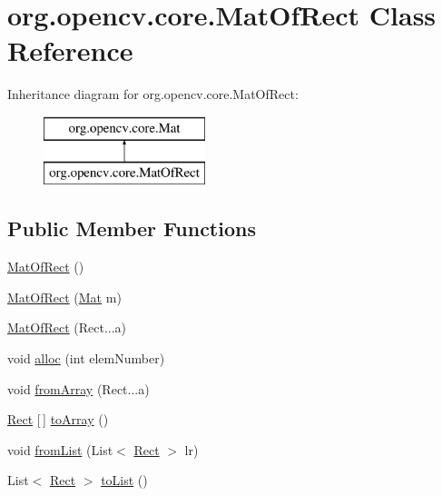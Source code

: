 \hypertarget{classorg_1_1opencv_1_1core_1_1_mat_of_rect}{}\section{org.\+opencv.\+core.\+Mat\+Of\+Rect Class Reference}
\label{classorg_1_1opencv_1_1core_1_1_mat_of_rect}
Inheritance diagram for org.\+opencv.\+core.\+Mat\+Of\+Rect\+:\begin{figure}[H]
\begin{center}
\leavevmode
\includegraphics[height=2.000000cm]{classorg_1_1opencv_1_1core_1_1_mat_of_rect}
\end{center}
\end{figure}
\subsection*{Public Member Functions}
\begin{DoxyCompactItemize}
\item 
\mbox{\hyperlink{classorg_1_1opencv_1_1core_1_1_mat_of_rect_aed75ce193773aa5db797a83e6a714a97}{Mat\+Of\+Rect}} ()
\item 
\mbox{\hyperlink{classorg_1_1opencv_1_1core_1_1_mat_of_rect_ab8740742fa18b3d836dd56f795f1dac5}{Mat\+Of\+Rect}} (\mbox{\hyperlink{classorg_1_1opencv_1_1core_1_1_mat}{Mat}} m)
\item 
\mbox{\hyperlink{classorg_1_1opencv_1_1core_1_1_mat_of_rect_a2b662761b046608ad3f1eced2b9f92ae}{Mat\+Of\+Rect}} (Rect...\+a)
\item 
void \mbox{\hyperlink{classorg_1_1opencv_1_1core_1_1_mat_of_rect_a761c8df15b71d5d9854b8616f8fdbca7}{alloc}} (int elem\+Number)
\item 
void \mbox{\hyperlink{classorg_1_1opencv_1_1core_1_1_mat_of_rect_afaa0f214e9d4e3659c605159dee4d133}{from\+Array}} (Rect...\+a)
\item 
\mbox{\hyperlink{classorg_1_1opencv_1_1core_1_1_rect}{Rect}} \mbox{[}$\,$\mbox{]} \mbox{\hyperlink{classorg_1_1opencv_1_1core_1_1_mat_of_rect_a17de540688a22e74500c4da2c0053176}{to\+Array}} ()
\item 
void \mbox{\hyperlink{classorg_1_1opencv_1_1core_1_1_mat_of_rect_a3ac6ecf845a01e79302cf8f01a9c9ff9}{from\+List}} (List$<$ \mbox{\hyperlink{classorg_1_1opencv_1_1core_1_1_rect}{Rect}} $>$ lr)
\item 
List$<$ \mbox{\hyperlink{classorg_1_1opencv_1_1core_1_1_rect}{Rect}} $>$ \mbox{\hyperlink{classorg_1_1opencv_1_1core_1_1_mat_of_rect_a4e9d644cca7bb3f02d0187a0a4242197}{to\+List}} ()
\end{DoxyCompactItemize}
